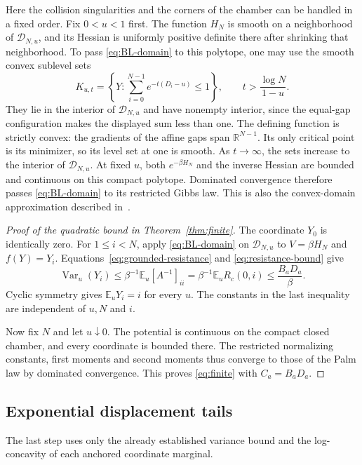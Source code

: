 \documentclass[11pt]{article}
\theoremstyle{remark}\newtheorem{remark}[theorem]{Remark}
\newcommand{\E}{\mathbb E}
\newcommand{\R}{\mathbb R}
\newcommand{\Var}{\operatorname{Var}}
\begin{document}
Here the collision singularities and the corners of the chamber
can be handled in a fixed order.  Fix $0<u<1$ first.  The function
$H_N$ is smooth on a neighborhood of $\mathcal D_{N,u}$, and its
Hessian is uniformly positive definite there after shrinking that
neighborhood.  To pass \eqref{eq:BL-domain} to this polytope, one
may use the smooth convex sublevel sets
\[
 K_{u,t}=\left\{Y:
             \sum_{i=0}^{N-1}e^{-t(D_i-u)}\le1\right\},
                   \qquad t>\frac{\log N}{1-u}.
\]
They lie in the interior of $\mathcal D_{N,u}$ and have nonempty
interior, since the equal-gap configuration makes the displayed
sum less than one.  The defining function is strictly convex:
the gradients of the affine gaps span $\R^{N-1}$.  Its only
critical point is its minimizer, so its level set at one is smooth.
As $t\to\infty$, the sets increase to the interior of
$\mathcal D_{N,u}$.  At fixed $u$, both $e^{-\beta H_N}$ and the
inverse Hessian are bounded and continuous on this compact
polytope.  Dominated convergence therefore passes
\eqref{eq:BL-domain} to its restricted Gibbs law.  This is also
the convex-domain approximation described in~\cite[Section~3.1.1]{KM}.

\begin{proof}[Proof of the quadratic bound in Theorem~\ref{thm:finite}]
The coordinate $Y_0$ is identically zero.  For $1\le i<N$, apply
\eqref{eq:BL-domain} on $\mathcal D_{N,u}$ to $V=\beta H_N$ and
$f(Y)=Y_i$.  Equations~\eqref{eq:grounded-resistance} and
\eqref{eq:resistance-bound} give
\[
 \Var_u(Y_i)
    \le\beta^{-1}\E_u[A^{-1}]_{ii}
    =\beta^{-1}\E_uR_c(0,i)
    \le\frac{B_aD_a}{\beta}.
\]
Cyclic symmetry gives $\E_uY_i=i$ for every $u$.  The constants
in the last inequality are independent of $u,N$ and $i$.

Now fix $N$ and let $u\downarrow0$.  The potential is continuous
on the compact closed chamber, and every coordinate is bounded
there.  The restricted normalizing constants, first moments and
second moments thus converge to those of the Palm law by dominated
convergence.  This proves \eqref{eq:finite} with
$C_a=B_aD_a$.
\end{proof}

\subsection{Exponential displacement tails}

The last step uses only the already established variance bound
and the log-concavity of each anchored coordinate marginal.
\end{document}
